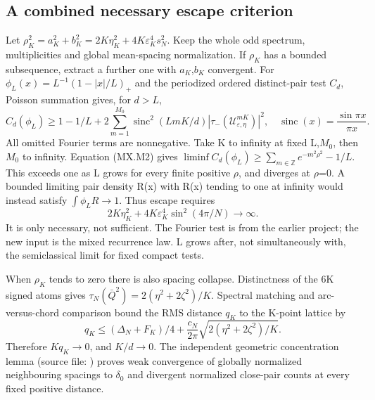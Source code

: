 \subsection{A combined necessary escape criterion}\label{mixed:a-combined-necessary-escape-criterion}

Let \(\rho_K^2=a_K^2+b_K^2=2K\eta_K^2+4K\varepsilon_K^4s_N^2\). Keep the whole odd spectrum, multiplicities and global mean-spacing normalization. If \(\rho_{K}\) has a bounded subsequence, extract a further one with \(a_{K}\),\(b_{K}\) convergent. For \(\phi_L(x)=L^{-1}(1-|x|/L)_+\) and the periodized ordered distinct-pair test \(C_{d}\), Poisson summation gives, for \(d>L\), \[
 C_d(\phi_L)\geq1-1/L+
 2\sum_{m=1}^{M_0}\operatorname{sinc}^2(LmK/d)
                    |\tau_-(\mathcal U_{\varepsilon,\eta}^{mK})|^2,
 \quad \operatorname{sinc}(x)=\frac{\sin\pi x}{\pi x}.         \tag{MX.M7}
\] All omitted Fourier terms are nonnegative. Take K to infinity at fixed L,\(M_{0}\), then \(M_{0}\) to infinity. Equation (MX.M2) gives \(\liminf C_d(\phi_L)\geq\sum_{m\in\mathbb Z}e^{-m^2\rho^2}-1/L\). This exceeds one as L grows for every finite positive \(\rho\), and diverges at \(\rho\)=0. A bounded limiting pair density R(x) with R(x) tending to one at infinity would instead satisfy \(\int\phi_LR\to1\). Thus escape requires \[
 \boxed{2K\eta_K^2+4K\varepsilon_K^4\sin^2(4\pi/N)\to\infty.} \tag{MX.M8}
\] It is only necessary, not sufficient. The Fourier test is from the earlier project; the new input is the mixed recurrence law. L grows after, not simultaneously with, the semiclassical limit for fixed compact tests.

When \(\rho_{K}\) tends to zero there is also spacing collapse. Distinctness of the 6K signed atoms gives \(\tau_N(\bar Q^2)=2(\eta^2+2\zeta^2)/K\). Spectral matching and arc-versus-chord comparison bound the RMS distance \(q_{K}\) to the K-point lattice by \[
 q_K\leq(\Delta_N+F_K)/4+
       \frac{c_N}{2\pi}\sqrt{2(\eta^2+2\zeta^2)/K}.
\] Therefore \(Kq_K\to0\), and \(K/d\to0\). The independent geometric concentration lemma (source file: ) proves weak convergence of globally normalized neighbouring spacings to \(\delta_{0}\) and divergent normalized close-pair counts at every fixed positive distance.

